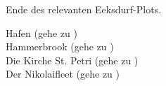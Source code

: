 
Ende des relevanten Eeksdurf-Plots.

Hafen (gehe zu \blue{\ref{Hafen}}) \\
Hammerbrook (gehe zu \blue{\ref{arm}}) \\
Die Kirche St. Petri (gehe zu \blue{\ref{Petri}}) \\
Der Nikolaifleet (gehe zu \blue{\ref{Fleet}}) \\
